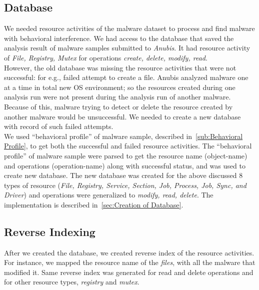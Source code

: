 \subsection{Database}
\label{sub:Database}
We needed resource activities of the malware dataset to process and find malware with behavioral interference.
We had access to the database that saved the analysis result of malware samples submitted to \emph{Anubis}.
It had resource activity of \emph{File, Registry, Mutex} for operations \emph{create, delete, modify, read}.
\\
However, the old database was missing the resource activities that were not successful: for e.g., failed attempt to create a file.
Anubis analyzed malware one at a time in total new OS environment; so the resources created during one analysis run were not present during the analysis run of another malware.
Because of this, malware trying to detect or delete the resource created by another malware would be unsuccessful.
We needed to create a new database with record of such failed attempts.\\
We used ``behavioral profile'' of malware sample, described in~\autoref{sub:Behavioral Profile}, to get both the successful and failed resource activities.
The ``behavioral profile'' of malware sample were parsed to get the resource name (object-name) and operations (operation-name) along with successful status, and was used to create new database.
The new database was created for the above discussed 8 types of resource (\emph{File, Registry, Service, Section, Job, Process, Job, Sync, and Driver}) and operations were generalized to \emph{modify, read, delete}.
The implementation is described in~\autoref{sec:Creation of Database}.

\subsection{Reverse Indexing}
\label{sub:Reverse Indexing}
After we created the database, we created reverse index of the resource activities.
For instance, we mapped the resource name of the \emph{files}, with all the malware that modified it.
Same reverse index was generated for read and delete operations and for other resource types, \emph{registry} and \emph{mutex}.
